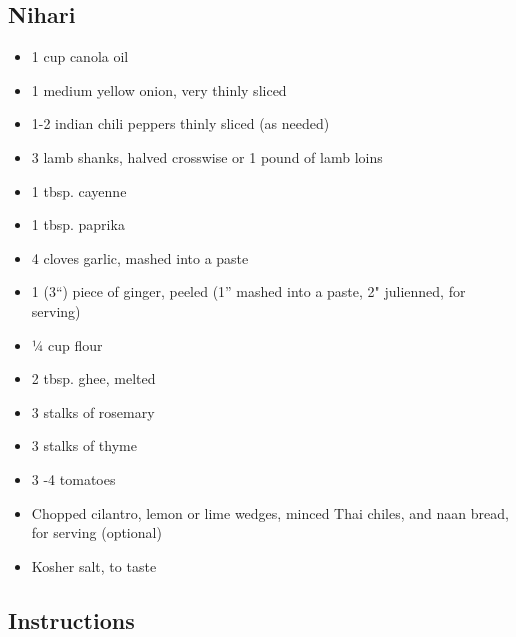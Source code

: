 \documentclass[
]{article}
\providecommand{\tightlist}{%
  \setlength{\itemsep}{0pt}\setlength{\parskip}{0pt}}
\begin{document}
\hypertarget{nihari}{%
\subsection{Nihari}\label{nihari}}

\begin{itemize}
\tightlist
\item
  1 cup canola oil
\item
  1 medium yellow onion, very thinly sliced
\item
  1-2 indian chili peppers thinly sliced (as needed)
\item
  3 lamb shanks, halved crosswise or 1 pound of lamb loins
\item
  1 tbsp. cayenne
\item
  1 tbsp. paprika
\item
  4 cloves garlic, mashed into a paste
\item
  1 (3``) piece of ginger, peeled (1'' mashed into a paste, 2" julienned, for serving)
\item
  1⁄4 cup flour
\item
  2 tbsp. ghee, melted
\item
  3 stalks of rosemary
\item
  3 stalks of thyme
\item
  3 -4 tomatoes
\item
  Chopped cilantro, lemon or lime wedges, minced Thai chiles, and naan bread, for serving (optional)
\item
  Kosher salt, to taste
\end{itemize}

\hypertarget{instructions}{%
\subsection{Instructions}\label{instructions}}
\end{document}
